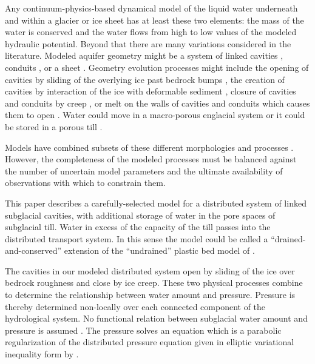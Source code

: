 \documentclass[gmd]{copernicus}   %
\begin{document}
\introduction

Any continuum-physics-based dynamical model of the liquid water underneath and within a glacier or ice sheet has at least these two elements: the mass of the water is conserved and the water flows from high to low values of the modeled hydraulic potential.  Beyond that there are many variations considered in the literature.  Modeled aquifer geometry might be a system of linked cavities \citep{Kamb1987}, conduits \citep{Nye1976}, or a sheet \citep{CreytsSchoof2009}.  Geometry evolution processes might include the opening of cavities by sliding of the overlying ice past bedrock bumps \citep{Schoof2005cavitation}, the creation of cavities by interaction of the ice with deformable sediment \citep{Schoof2007deformable}, closure of cavities and conduits by creep \citep{Hewitt2011}, or melt on the walls of cavities and conduits which causes them to open \citep{Clarke05}.  Water could move in a macro-porous englacial system \citep{Bartholomausetal2011} or it could be stored in a porous till \citep{Tulaczyketal2000}.

Models have combined subsets of these different morphologies and processes \citep{FlowersClarke2002_theory,Hewitt2013,HoffmanPrice2014,vanderWeletal2013,Werderetal2013,deFleurianetal2014}.  However, the completeness of the modeled processes must be balanced against the number of uncertain model parameters and the ultimate availability of observations with which to constrain them.

This paper describes a carefully-selected model for a distributed system of linked subglacial cavities, with additional storage of water in the pore spaces of subglacial till.  Water in excess of the capacity of the till passes into the distributed transport system.  In this sense the model could be called a ``drained-and-conserved'' extension of the ``undrained'' plastic bed model of \cite{Tulaczyketal2000b}.

The cavities in our modeled distributed system open by sliding of the ice over bedrock roughness and close by ice creep.  These two physical processes combine to determine the relationship between water amount and pressure.  Pressure is thereby determined non-locally over each connected component of the hydrological system.  No functional relation between subglacial water amount and pressure is assumed \citep[compare][]{FlowersClarke2002_theory}.  The pressure solves an equation which is a parabolic regularization of the distributed pressure equation given in elliptic variational inequality form by \cite{Schoofetal2012}.
\end{document}
